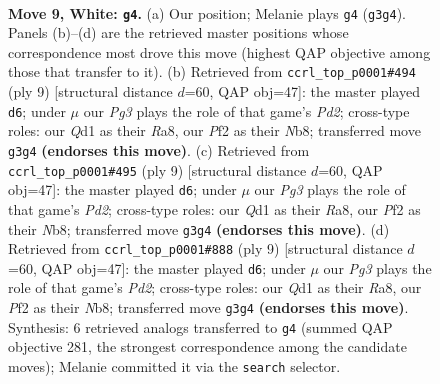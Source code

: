 \documentclass[11pt]{article}
\begin{document}
\clearpage

\begin{figure}[p]\centering
\begin{subfigure}{0.46\textwidth}\centering
\resizebox{\linewidth}{!}{%
\newchessgame
\chessboard[
  setfen={rnbqr1k1/pp2bppp/4pn2/2p5/2Pp4/1P3NPB/P2PPPKP/RNBQ1R2 w - - 0 9},
  showmover=false,
  pgfstyle=straightmove, color=movearrow, markmove={g3-g4}
]}
\caption{}
\end{subfigure}\hfill
\begin{subfigure}{0.46\textwidth}\centering
\resizebox{\linewidth}{!}{%
\newchessgame
\chessboard[
  setfen={rn1qkb1r/pb1ppppp/1p3n2/2p5/2P1P3/2NP1N2/PP3PPP/R1BQKB1R b KQkq - 0 5},
  showmover=false,
  pgfstyle=straightmove, color=movearrow, markmove={d7-d6}
]}
\caption{}
\end{subfigure}
\\[4pt]
\begin{subfigure}{0.46\textwidth}\centering
\resizebox{\linewidth}{!}{%
\newchessgame
\chessboard[
  setfen={rn1qkb1r/pb1ppppp/1p3n2/2p5/2P1P3/2NP1N2/PP3PPP/R1BQKB1R b KQkq - 0 5},
  showmover=false,
  pgfstyle=straightmove, color=movearrow, markmove={d7-d6}
]}
\caption{}
\end{subfigure}\hfill
\begin{subfigure}{0.46\textwidth}\centering
\resizebox{\linewidth}{!}{%
\newchessgame
\chessboard[
  setfen={rn1qkb1r/pb1ppppp/1p3n2/2p5/2P1P3/2NP1N2/PP3PPP/R1BQKB1R b KQkq - 0 5},
  showmover=false,
  pgfstyle=straightmove, color=movearrow, markmove={d7-d6}
]}
\caption{}
\end{subfigure}
\caption{\textbf{Move 9, White: \texttt{g4}.} (a) Our position; Melanie plays \texttt{g4} (\texttt{g3g4}). Panels (b)--(d) are the retrieved master positions whose correspondence most drove this move (highest QAP objective among those that transfer to it). (b) Retrieved from \texttt{ccrl\_top\_p0001\#494} (ply 9) [structural distance $d$=60, QAP obj=47]: the master played \texttt{d6}; under $\mu$ our \emph{Pg3} plays the role of that game's \emph{Pd2}; cross-type roles: our \emph{Q}d1 as their \emph{R}a8, our \emph{P}f2 as their \emph{N}b8; transferred move \texttt{g3g4} \textbf{(endorses this move)}. (c) Retrieved from \texttt{ccrl\_top\_p0001\#495} (ply 9) [structural distance $d$=60, QAP obj=47]: the master played \texttt{d6}; under $\mu$ our \emph{Pg3} plays the role of that game's \emph{Pd2}; cross-type roles: our \emph{Q}d1 as their \emph{R}a8, our \emph{P}f2 as their \emph{N}b8; transferred move \texttt{g3g4} \textbf{(endorses this move)}. (d) Retrieved from \texttt{ccrl\_top\_p0001\#888} (ply 9) [structural distance $d$=60, QAP obj=47]: the master played \texttt{d6}; under $\mu$ our \emph{Pg3} plays the role of that game's \emph{Pd2}; cross-type roles: our \emph{Q}d1 as their \emph{R}a8, our \emph{P}f2 as their \emph{N}b8; transferred move \texttt{g3g4} \textbf{(endorses this move)}. Synthesis: 6 retrieved analogs transferred to \texttt{g4} (summed QAP objective 281, the strongest correspondence among the candidate moves); Melanie committed it via the \texttt{search} selector.}
\label{fig:thought-m16}
\end{figure}
\end{document}
